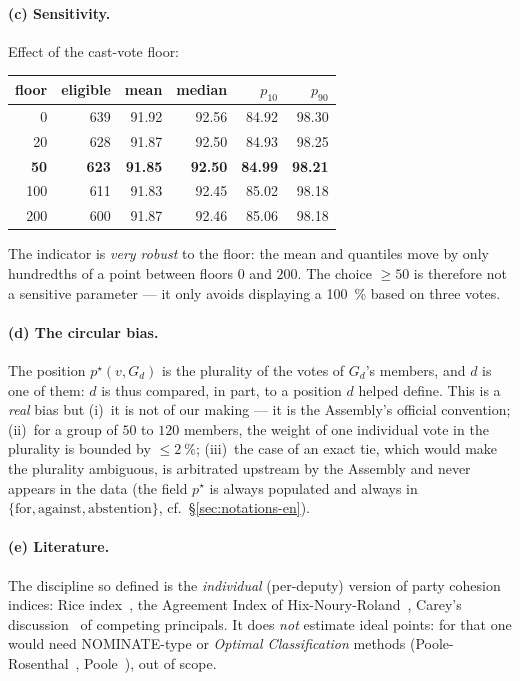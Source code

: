 \paragraph{(c) Sensitivity.} Effect of the cast-vote floor:
\begin{center}\small
\begin{tabular}{rrrrrr}
\toprule
floor & eligible & mean & median & $p_{10}$ & $p_{90}$ \\
\midrule
0   & 639 & 91.92 & 92.56 & 84.92 & 98.30 \\
20  & 628 & 91.87 & 92.50 & 84.93 & 98.25 \\
\textbf{50}  & \textbf{623} & \textbf{91.85} & \textbf{92.50} & \textbf{84.99} & \textbf{98.21} \\
100 & 611 & 91.83 & 92.45 & 85.02 & 98.18 \\
200 & 600 & 91.87 & 92.46 & 85.06 & 98.18 \\
\bottomrule
\end{tabular}
\end{center}
The indicator is \emph{very robust} to the floor: the mean and quantiles move by
only hundredths of a point between floors $0$ and $200$. The choice $\ge 50$ is
therefore not a sensitive parameter — it only avoids displaying a \og{}100~\%\fg{}
based on three votes.

\paragraph{(d) The \og{}circular bias\fg{}.} The position $p^\star(v,G_d)$ is the
plurality of the votes of $G_d$'s members, and $d$ is one of them: $d$ is thus
compared, in part, to a position $d$ helped define. This is a \emph{real} bias but
(i)~it is not of our making — it is the Assembly's official convention;
(ii)~for a group of $50$ to $120$ members, the weight of one individual vote in
the plurality is bounded by $\le 2~\%$; (iii)~the case of an exact tie, which would
make the plurality ambiguous, is arbitrated upstream by the Assembly and never
appears in the data (the field $p^\star$ is always populated and always in
$\{\text{for},\text{against},\text{abstention}\}$, cf.~§\ref{sec:notations-en}).

\paragraph{(e) Literature.} The discipline so defined is the \emph{individual}
(per-deputy) version of party cohesion indices: Rice index~\cite{rice1925},
the Agreement Index of Hix-Noury-Roland~\cite{hnr2005,hnr2007}, Carey's
discussion~\cite{carey2007} of \og{}competing principals\fg{}. It does \emph{not}
estimate ideal points: for that one would need NOMINATE-type or \emph{Optimal
Classification} methods (Poole-Rosenthal~\cite{pr1997}, Poole~\cite{poole2005}),
out of scope.

